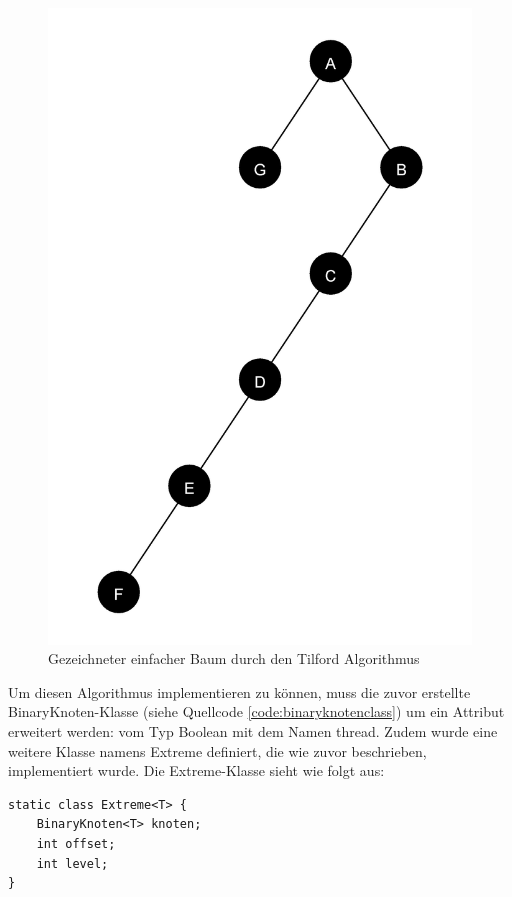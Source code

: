 \begin{figure}[H]
    \centering
    \includegraphics[scale = 0.07]{abbildungen/baum_algo_3_n2}
    \caption{Gezeichneter einfacher Baum durch den Tilford Algorithmus}
    \label{pic:baum_algo_3_n2} 
\end{figure}

Um diesen Algorithmus implementieren zu können, muss die zuvor erstellte BinaryKnoten-Klasse (siehe Quellcode \ref{code:binaryknotenclass}) um ein 
Attribut erweitert werden: vom Typ Boolean mit dem Namen \glqq thread\grqq{}. Zudem wurde eine weitere Klasse 
namens \glqq Extreme\grqq{} definiert, die wie zuvor beschrieben, implementiert wurde. Die Extreme-Klasse sieht wie folgt aus:

\begin{lstlisting}[caption=Implementierung der Extreme-Klasse, label=code:algo3_extreme]
static class Extreme<T> {
    BinaryKnoten<T> knoten;
    int offset;
    int level;
}
\end{lstlisting}

